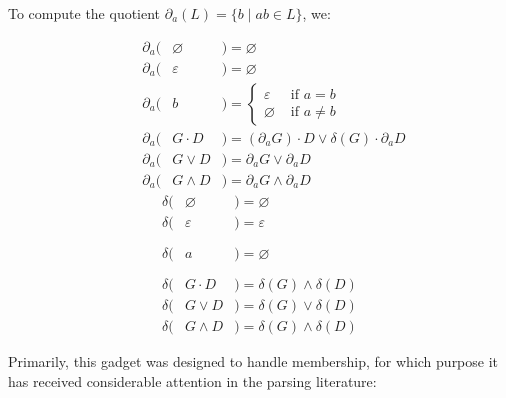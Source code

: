 \documentclass[sigplan,review,acmsmall,nonacm,screen,anonymous]{acmart}\settopmatter{printfolios=false,printccs=false,printacmref=false}
\begin{document}
  \begin{definition}[Brzozowski, 1964]
    To compute the quotient \(\partial_a(L) = \{b \mid ab \in L\}\), we:

    \vspace{-0.8cm}
    \begin{multicols}{2}
      \begin{eqnarray*}
        \phantom{--}\partial_a(& \varnothing &) = \varnothing                                           \\
        \phantom{--}\partial_a(& \varepsilon &) = \varnothing                                           \\
        \phantom{--}\partial_a(& b           &) = \begin{cases}\varepsilon &\text{ if } a = b\\ \varnothing &\text{ if } a \neq b \end{cases}\\
        \phantom{--}\partial_a(& G\cdot D    &) = (\partial_a G)\cdot D \vee \delta(G)\cdot\partial_a D \\
        \phantom{--}\partial_a(& G\vee  D    &) =  \partial_a G \vee  \partial_a D                       \\
        \phantom{--}\partial_a(& G\land D    &) =  \partial_a G \land \partial_a D
      \end{eqnarray*} \break\vspace{-0.45cm}
      \begin{eqnarray*}
        \delta(& \varnothing &) = \varnothing                                      \\
        \delta(& \varepsilon &) = \varepsilon                                      \\
        \delta(& a           &) = \varnothing\phantom{\begin{cases}\varepsilon\\\varnothing\end{cases}}\\
        \delta(& G\cdot D    &) = \delta(G) \land \delta(D)                        \\
        \delta(& G\vee  D    &) = \delta(G) \vee  \delta(D)                        \\
        \delta(& G\land D    &) = \delta(G) \land \delta(D)
      \end{eqnarray*}
    \end{multicols}
  \end{definition}

  Primarily, this gadget was designed to handle membership, for which purpose it has received considerable attention in the parsing literature:
\end{document}
